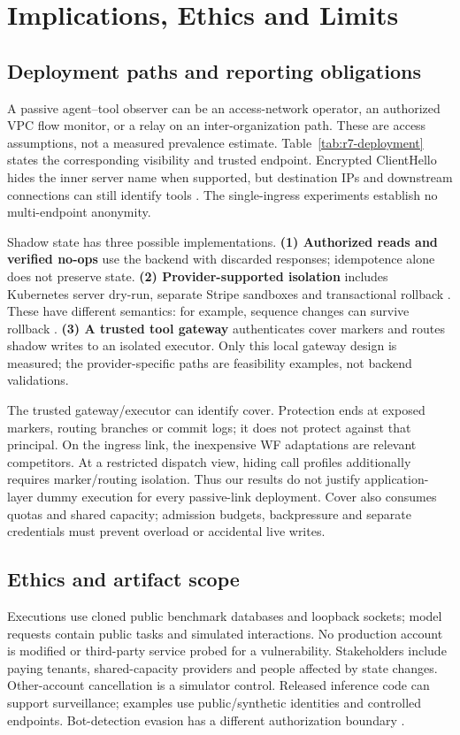 \section{Implications, Ethics and Limits}\label{sec:agenda}
\subsection{Deployment paths and reporting obligations}\label{sec:deployment}
A passive agent--tool observer can be an access-network operator, an authorized VPC flow monitor, or a relay on an inter-organization path. These are access assumptions, not a measured prevalence estimate. Table~\ref{tab:r7-deployment} states the corresponding visibility and trusted endpoint. Encrypted ClientHello hides the inner server name when supported, but destination IPs and downstream connections can still identify tools \cite{rfc9849}. The single-ingress experiments establish no multi-endpoint anonymity.


Shadow state has three possible implementations. \textbf{(1) Authorized reads and verified no-ops} use the backend with discarded responses; idempotence alone does not preserve state. \textbf{(2) Provider-supported isolation} includes Kubernetes server dry-run, separate Stripe sandboxes and transactional rollback \cite{kubernetesdryrun,stripesandboxes,postgresrollback}. These have different semantics: for example, sequence changes can survive rollback \cite{postgressequences}. \textbf{(3) A trusted tool gateway} authenticates cover markers and routes shadow writes to an isolated executor. Only this local gateway design is measured; the provider-specific paths are feasibility examples, not backend validations.

The trusted gateway/executor can identify cover. Protection ends at exposed markers, routing branches or commit logs; it does not protect against that principal. On the ingress link, the inexpensive WF adaptations are relevant competitors. At a restricted dispatch view, hiding call profiles additionally requires marker/routing isolation. Thus our results do not justify application-layer dummy execution for every passive-link deployment. Cover also consumes quotas and shared capacity; admission budgets, backpressure and separate credentials must prevent overload or accidental live writes.

\subsection{Ethics and artifact scope}\label{sec:ethics}
Executions use cloned public benchmark databases and loopback sockets; model requests contain public tasks and simulated interactions. No production account is modified or third-party service probed for a vulnerability. Stakeholders include paying tenants, shared-capacity providers and people affected by state changes. Other-account cancellation is a simulator control. Released inference code can support surveillance; examples use public/synthetic identities and controlled endpoints. Bot-detection evasion has a different authorization boundary \cite{zhu2026turing,jeong2026wra}.


